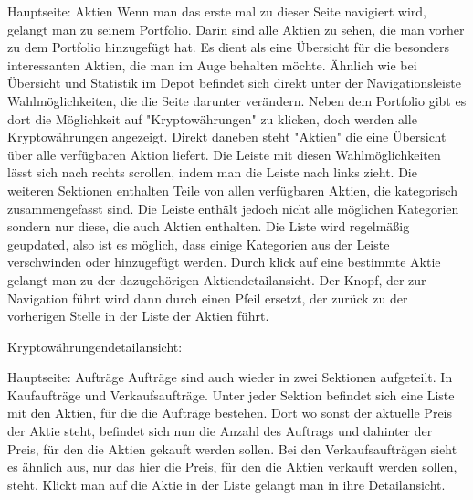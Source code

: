 \documentclass[10pt]{scrartcl}
\begin{document}
	
	

Hauptseite: Aktien
Wenn man das erste mal zu dieser Seite navigiert wird, gelangt man zu seinem Portfolio. Darin sind alle Aktien zu sehen, die man vorher zu dem Portfolio hinzugefügt hat. Es dient als eine Übersicht für die besonders interessanten Aktien, die man im Auge behalten möchte. Ähnlich wie bei Übersicht und Statistik im Depot befindet sich direkt unter der Navigationsleiste Wahlmöglichkeiten, die die Seite darunter verändern. Neben dem Portfolio gibt es dort die Möglichkeit auf "Kryptowährungen" zu klicken, doch werden alle Kryptowährungen angezeigt. Direkt daneben steht "Aktien" die eine Übersicht über alle verfügbaren Aktion liefert. Die Leiste mit diesen Wahlmöglichkeiten lässt sich nach rechts scrollen, indem man die Leiste nach links zieht. Die weiteren Sektionen enthalten Teile von allen verfügbaren Aktien, die kategorisch zusammengefasst sind. Die Leiste enthält jedoch nicht alle möglichen Kategorien sondern nur diese, die auch Aktien enthalten. Die Liste wird regelmäßig geupdated, also ist es möglich, dass einige Kategorien aus der Leiste verschwinden oder hinzugefügt werden.
Durch klick auf eine bestimmte Aktie gelangt man zu der dazugehörigen Aktiendetailansicht. Der Knopf, der zur Navigation führt wird dann durch einen Pfeil ersetzt, der zurück zu der vorherigen Stelle in der Liste der Aktien führt.

Kryptowährungendetailansicht:



Hauptseite: Aufträge
Aufträge sind auch wieder in zwei Sektionen aufgeteilt. In Kaufaufträge und Verkaufsaufträge. Unter jeder Sektion befindet sich eine Liste mit den Aktien, für die die Aufträge bestehen. Dort wo sonst der aktuelle Preis der Aktie steht, befindet sich nun die Anzahl des Auftrags und dahinter der Preis, für den die Aktien gekauft werden sollen. Bei den Verkaufsaufträgen sieht es ähnlich aus, nur das hier die Preis, für den die Aktien verkauft werden sollen, steht.
Klickt man auf die Aktie in der Liste gelangt man in ihre Detailansicht.

\end{document}
